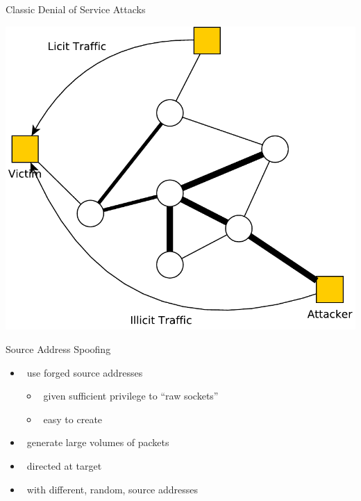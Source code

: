 \documentclass{beamer}
\begin{document}
\begin{frame}{Classic Denial of Service Attacks}
  \begin{center}
    \includegraphics[width=0.8\linewidth]{dos1}
  \end{center}
\end{frame}

\begin{frame}{Source Address Spoofing }
  \begin{itemize}
  \item  use forged source addresses 
    \begin{itemize}
    \item  given sufficient privilege to “raw sockets” 
    \item  easy to create 
    \end{itemize}
  \item  generate large volumes of packets 
  \item  directed at target 
  \item  with different, random, source addresses
  \end{itemize}
\end{frame}
\end{document}

